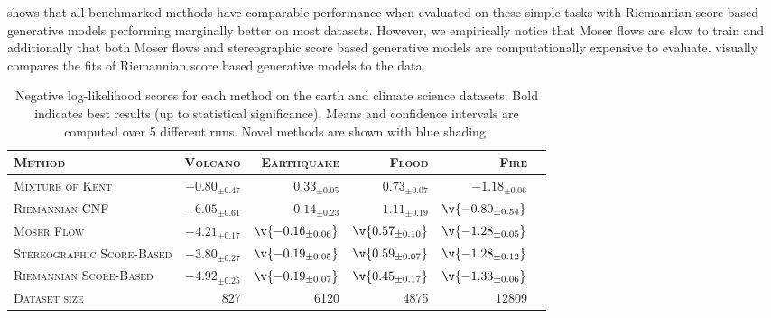  shows that all benchmarked methods have comparable performance when evaluated on these simple tasks with Riemannian score-based generative models performing marginally better on most datasets.
However, we empirically notice that Moser flows are slow to train and additionally that both Moser flows and stereographic score based generative models are computationally expensive to evaluate.
 visually compares the fits of Riemannian score based generative models to the data.
\begin{table}[h]
	\centering
	\small
	\begin{tabular}{lrrrrr}
		\toprule
		\scshape Method                    & \scshape {Volcano}                               & \scshape {Earthquake}                              & \scshape {Flood}                                  & \scshape {Fire}                                    \\
		\midrule
		\scshape Mixture of Kent           & \(-0.80_{\pm 0.47}\)                      & \(0.33_{\pm 0.05}\)                         & \(0.73_{\pm 0.07}\)                        & \(-1.18_{\pm 0.06}\)                        \\
		\scshape Riemannian CNF            & \(\bm{-6.05_{\pm 0.61}}\)                  & \({0.14_{\pm 0.23}}\)                       & \({1.11_{\pm 0.19}}\)                      & \(\v{-0.80_{\pm 0.54}}\)                    \\
		\scshape Moser Flow                & \({-4.21_{\pm 0.17}}\)                    & \(\v{-0.16_{\pm 0.06}}\)                    & \(\v{0.57_{\pm 0.10}}\)                    & \(\v{-1.28_{\pm 0.05}}\)                    \\
		\rowcolor{pearDark!20} \scshape Stereographic Score-Based & \({-3.80_{\pm 0.27}}\) & \(\v{-0.19_{\pm 0.05}}\) & \(\v{0.59_{\pm 0.07}}\) & \(\v{-1.28_{\pm 0.12}}\) \\
		\rowcolor{pearDark!20} \scshape Riemannian Score-Based    & \({-4.92_{\pm 0.25}}\) & \(\v{-0.19_{\pm 0.07}}\) & \(\v{0.45_{\pm 0.17}}\) & \(\v{-1.33_{\pm 0.06}}\) \\
		\midrule
		\scshape Dataset size              & 827                                     & 6120                                      & 4875                                     & 12809                                     \\
		\bottomrule
	\end{tabular}
	\caption{
		Negative log-likelihood scores for each method on the earth and climate science datasets.
		Bold indicates best results (up to statistical significance).
		Means and confidence intervals are computed over 5 different runs.
		Novel methods are shown with blue shading.
	}
	\label{tab:geoscience}
\end{table}

